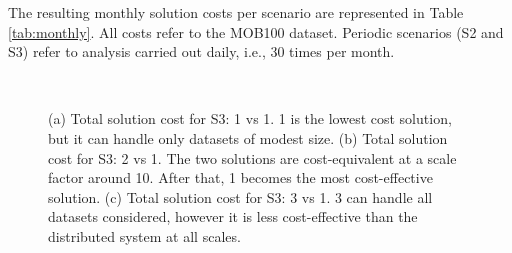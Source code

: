{The resulting monthly solution costs per scenario are represented in Table \ref{tab:monthly}. All costs refer to the MOB100 dataset. Periodic scenarios (S2 and S3) refer to analysis carried out daily, i.e., 30 times per month.

\begin{figure}[p]
  \centering
    \\
\caption{(a) Total solution cost for S3: \sti{}1 vs \sparkdi{}1. \sti{}1 is the lowest cost solution, but it can handle only datasets of modest size. (b) Total solution cost for S3: \sti{}2 vs \sparkdi{}1. The two solutions are cost-equivalent at a scale factor around 10. After that, \sparkdi{}1 becomes the most cost-effective solution. (c) Total solution cost for S3: \sti{}3 vs \sparkdi{}1. \sti{}3 can handle all datasets considered, however it is less cost-effective than the distributed system at all scales.}
\label{fig:NvsSpark}
\end{figure}

}
